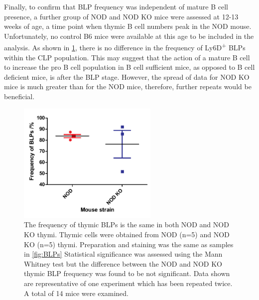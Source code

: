 Finally, to confirm that BLP frequency was independent of mature B cell presence, a further group of NOD and NOD KO mice were assessed at 12-13 weeks of age, a time point when thymic B cell numbers peak in the NOD mouse. 
Unfortunately, no control B6 mice were available at this age to be included in the analysis.
As shown in \cref{fig:olderBLPs}, there is no difference in the frequency of Ly6D\textsuperscript{+} BLPs within the CLP population.
This may suggest that the action of a mature B cell to increase the pro B cell population in B cell sufficient mice, as opposed to B cell deficient mice, is after the BLP stage.
However, the spread of data for NOD KO mice is much greater than for the NOD mice, therefore, further repeats would be beneficial.

\begin{figure}
\centering
\includegraphics[width=0.6\textwidth]{Figures/NODvKOBLPs.pdf}
\caption[The frequency of thymic BLPs is the same in both NOD and NOD KO thymi]{The frequency of thymic BLPs is the same in both NOD and NOD KO thymi.
Thymic cells were obtained from NOD (n=5) and NOD KO (n=5) thymi. Preparation and staining was the same as samples in \cref{fig:BLPs}
Statistical significance was assessed using the Mann Whitney test but the difference between the NOD and NOD KO thymic BLP frequency was found to be not significant.
Data shown are representative of one experiment which has been repeated twice. A total of 14 mice were examined.}
\label{fig:olderBLPs}
\end{figure}






